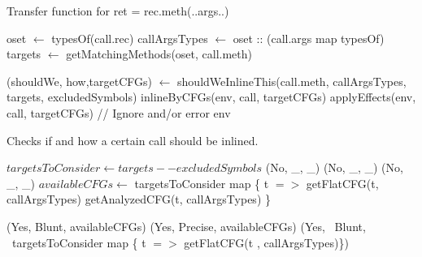 \documentclass[a4paper]{article}
\begin{document}
\begin{algorithm}
\caption{Transfer function for ret = rec.meth(..args..)}\label{algo:pt:methcall}
\begin{algorithmic}[1]
    \State oset $\gets$ typesOf(call.rec)
    \State callArgsTypes $\gets$ oset :: (call.args map typesOf)
    \State targets $\gets$ getMatchingMethods(oset, call.meth)

    \State (shouldWe, how,targetCFGs) $\gets$ shouldWeInlineThis(call.meth, callArgsTypes, targets, excludedSymbols)
            \State \Return inlineByCFGs(env, call, targetCFGs)
        \Else
            \State \Return applyEffects(env, call, targetCFGs)
        \EndIf
    \Else
        \State // Ignore and/or error
        \State \Return env
    \EndIf
\EndFunction
\end{algorithmic}
\end{algorithm}

\begin{algorithm}
\caption{Checks if and how a certain call should be inlined.}\label{algo:pt:shouldwe}
\begin{algorithmic}[1]
    \State $targetsToConsider \gets targets -- excludedSymbols$
            \State \Return (No, \_, \_)
            \State \Return (No, \_, \_)
            \State \Return (No, \_, \_)
        \Else
            \State $availableCFGs \gets$ targetsToConsider map \{ t $=>$
                \State getFlatCFG(t, callArgsTypes)
            \Else
                \State getAnalyzedCFG(t, callArgsTypes)
            \EndIf
            \State \}

                \State \Return (Yes, Blunt, availableCFGs)
            \Else
                \State \Return (Yes, Precise, availableCFGs)
            \EndIf
        \EndIf
    \Else
        \State \Return (Yes, ~Blunt, ~targetsToConsider map \{ t $=>$ getFlatCFG(t , callArgsTypes)\})
    \EndIf
\EndFunction
\end{algorithmic}
\end{algorithm}
\end{document}
